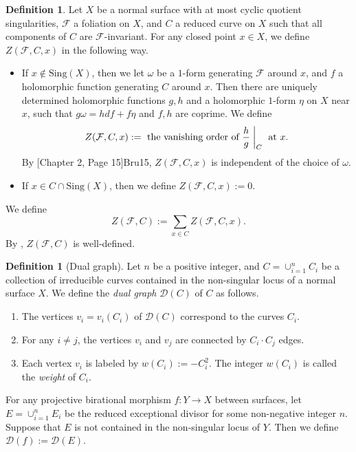 \documentclass[11pt]{amsart}
\numberwithin{equation}{section}
\newcommand{\Ff}{\mathcal{F}}
\newcommand{\Sing}{\mathrm{Sing}}
\theoremstyle{definition}
\newtheorem{defn}[thm]{Definition}
\theoremstyle{definition}
\theoremstyle{definition}
\begin{document}
\begin{defn}
Let $X$ be a normal surface with at most cyclic quotient singularities, $\Ff$ a foliation on $X$, and $C$ a reduced curve on $X$ such that all components of $C$ are $\Ff$-invariant. For any closed point $x\in X$, we define $Z(\Ff,C,x)$ in the following way.
\begin{itemize}
\item If $x\notin \Sing(X)$, then we let $\omega$ be a $1$-form generating $\Ff$ around $x$, and $f$ a holomorphic function generating $C$ around $x$. Then there are uniquely determined holomorphic functions $g,h$ and a holomorphic $1$-form $\eta$ on $X$ near $x$, such that $g\omega=hdf+f\eta$ and $f,h$ are coprime. We define 
$$Z(\Ff,C,x):= \text{ the vanishing order of }\frac{h}{g}\biggm|_C\text{ at }x.$$
By [Chapter 2, Page 15]{Bru15}, $Z(\Ff,C,x)$ is independent of the choice of $\omega$.
\item If $x\in C\cap \Sing(X)$, then we define 
$Z(\Ff,C,x):=0.$
\end{itemize}
We define $$Z(\Ff,C):=\sum_{x\in C}Z(\Ff,C,x).$$
By \cite[Section 2]{Bru02}, $Z(\Ff,C)$ is well-defined.
\end{defn}


\begin{defn}[Dual graph]\label{defn: dual graph}
Let $n$ be a positive integer, and $C=\cup_{i=1}^nC_i$ be a collection of irreducible curves contained in the non-singular locus of a normal surface $X$. We define the \emph{dual graph} $\mathcal{D}(C)$ of $C$ as follows.
\begin{enumerate}
    \item The vertices $v_i=v_i(C_i)$ of $\mathcal{D}(C)$ correspond to the curves $C_i$.
    \item For any $i\neq j$, the vertices $v_i$ and $v_j$ are connected by $C_i\cdot C_j$ edges.
    \item Each vertex $v_i$ is labeled by $w(C_i):=-C_i^2$. The integer $w(C_i)$ is called the \emph{weight} of $C_i$.
\end{enumerate}
For any projective birational morphism $f: Y\rightarrow X$ between surfaces, let $E=\cup_{i=1}^nE_i$ be the reduced exceptional divisor for some non-negative integer $n$. Suppose that $E$ is not contained in the non-singular locus of $Y$. Then we define $\mathcal{D}(f):=\mathcal{D}(E)$.
\end{defn}
\end{document}
